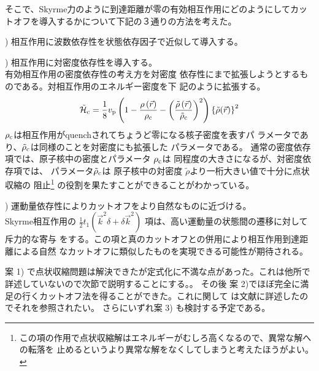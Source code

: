 そこで、Skyrme力のように到達距離が零の有効相互作用にどのようにしてカッ
トオフを導入するかについて下記の３通りの方法を考えた。

\vspace*{2mm}

) 相互作用に波数依存性を状態依存因子で近似して導入する。

\vspace*{2mm}

) 相互作用に対密度依存性を導入する。\\
有効相互作用の密度依存性の考え方を対密度
依存性にまで拡張しようとするものである。対相互作用のエネルギー密度を下
記のように拡張する。
%
\begin{equation}
\tilde{\cal H}_{\rm c} = \frac{1}{8} v_{\rm p} 
\left( 1-\frac{\rho\left(\vec{r}\right)}{\rho_{\rm c}}
-\left(\frac{\tilde{\rho}\left(\vec{r}\right)}{\tilde{\rho}_{\rm c}}\right)^2
\right)
\left\{\tilde{\rho} (\vec{r})\right\}^2
\end{equation}
%
$\rho_{\rm c}$は相互作用がquenchされてちょうど零になる核子密度を表すパ
ラメータであり、$\tilde{\rho}_{\rm c}$は同様のことを対密度にも拡張した
パラメータである。
通常の密度依存項では、原子核中の密度とパラメータ $\rho_{\rm c}$は
同程度の大きさになるが、対密度依存項では、
パラメータ$\tilde{\rho}_{\rm c}$は
原子核中の対密度 $\tilde{\rho}$より一桁大きい値で十分に点状収縮の
阻止\footnote{
%
この項の作用で点状収縮解はエネルギーがむしろ高くなるので、異常な解への転落を
止めるというより異常な解をなくしてしまうと考えたほうがよい。
%
}
の役割を果たすことができることがわかっている。

\vspace*{2mm}

) 運動量依存性によりカットオフをより自然なものに近づける。\\
Skyrme相互作用の $\frac{1}{2} t_1 \left( \vec{k}^2 \delta + \delta
\vec{k}^2 \right)$ 項は、高い運動量の状態間の遷移に対して斥力的な寄与
をする。この項と真のカットオフとの併用により相互作用到達距離による自然
なカットオフに類似したものを実現できる可能性が期待される\cite{TOT94}。

\vspace*{2mm}

案 1) で点状収縮問題は解決できたが定式化に不満な点があった。これは他所で
詳述していないので次節で説明することにする。。
その後 案 2)でほぼ完全に満足の行くカットオフ法を得ることができた。これに関して
は文献\cite{Taj00a}に詳述したのでそれを参照されたい。
さらにいずれ案 3) も検討する予定である。


